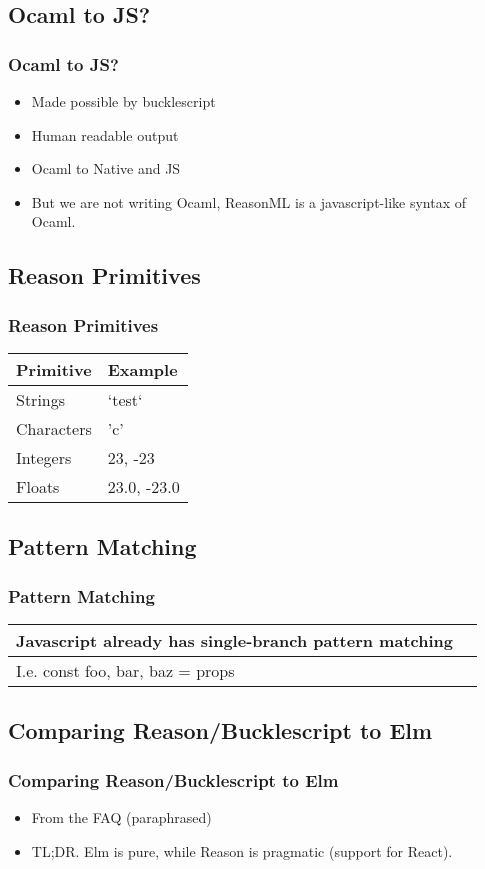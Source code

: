 \documentclass{beamer}
\begin{document}
\begin{frame}
  \section{Ocaml to JS?}
  \frametitle{Ocaml to JS?}
  \pause
  \begin{itemize}
  \item Made possible by bucklescript
    \pause
  \item Human readable output
    \pause
  \item Ocaml to Native and JS
    \pause
  \item But we are not writing Ocaml, ReasonML is a javascript-like syntax of Ocaml.
  \end{itemize}
\end{frame}

\begin{frame}
  \section{Reason Primitives}
  \frametitle{Reason Primitives}
    \begin{tabular}{ | l | p{5cm} |}
      \hline
      Primitive & Example \\ \hline
      Strings & `test` \\ \hline
      Characters & 'c' \\ \hline
      Integers & 23, -23 \\ \hline
      Floats & 23.0, -23.0 \\
      \hline
    \end{tabular}
\end{frame}

\begin{frame}
  \section{Pattern Matching}
  \frametitle{Pattern Matching}
  \begin{tabular}{ | l | p{5cm} |}
    \hline
    Javascript already has single-branch pattern matching \\ \hline
    I.e. const {foo, bar, baz} = props \\ \hline
  \end{tabular}
\end{frame}


\begin{frame}
  \section{Comparing Reason/Bucklescript to Elm}
  \frametitle{Comparing Reason/Bucklescript to Elm}
  \pause
  \begin{itemize}
  \item From the FAQ (paraphrased)
    \pause
  \item TL;DR. Elm is pure, while Reason is pragmatic (support for React).
    \pause
  \end{itemize}
\end{frame}
\end{document}
